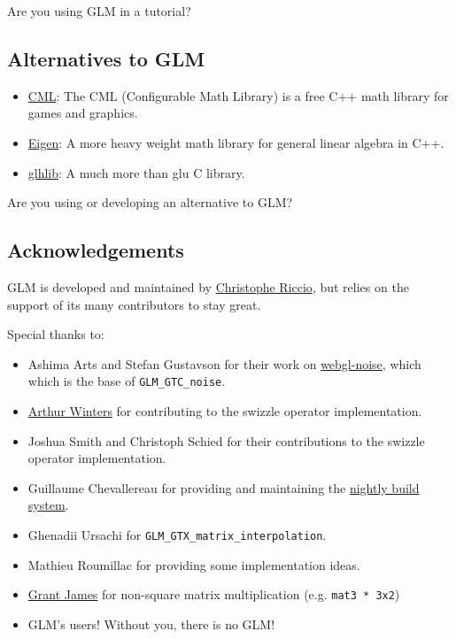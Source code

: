 \documentclass{scrartcl}
\numberwithin{figure}{subsection}
\begin{document}
Are you using GLM in a tutorial?  


\subsection{Alternatives to GLM}

\begin{itemize}
  \item \href{http://cmldev.net/}{CML}: The CML (Configurable Math Library) is a free C++ math library for games and graphics.
  \item \href{http://eigen.tuxfamily.org/}{Eigen}: A more heavy weight math library for general linear algebra in C++.
  \item \href{http://glhlib.sourceforge.net/}{glhlib}: A much more than glu C library.
\end{itemize}

Are you using or developing an alternative to GLM?  

\subsection{Acknowledgements}

GLM is developed and maintained by \href{http://www.g-truc.net}{Christophe Riccio}, but relies on the support of its many contributors to stay great.

Special thanks to:

\begin{itemize}
  \item Ashima Arts and Stefan Gustavson for their work on \href{https://github.com/ashima/webgl-noise}{webgl-noise}, which which is the base of \verb|GLM_GTC_noise|.
  \item \href{http://athile.net/library/wiki/index.php?title=Athile_Technologies}{Arthur Winters} for contributing to the swizzle operator implementation.
  \item Joshua Smith and Christoph Schied for their contributions to the swizzle operator implementation.
  \item Guillaume Chevallereau for providing and maintaining the \href{http://my.cdash.org/index.php?project=GLM}{nightly build system}.
  \item Ghenadii Ursachi for \verb|GLM_GTX_matrix_interpolation|.
  \item Mathieu Roumillac for providing some implementation ideas.
  \item \href{http://www.zeuscmd.com/}{Grant James} for non-square matrix multiplication (e.g. \verb|mat3 * 3x2|)
  \item GLM's users!  Without you, there is no GLM!
\end{itemize}
\end{document}
